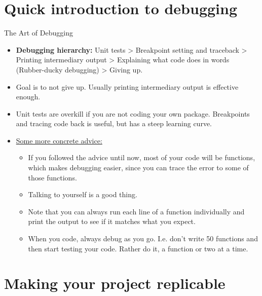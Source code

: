 \documentclass[aspectratio=169,xcolor=dvipsnames]{beamer}\usepackage[]{graphicx}\usepackage[]{color}
\begin{document}
\section{Quick introduction to debugging}

\begin{frame}[t]{The Art of Debugging}
  \begin{itemize}
    \item \textbf{Debugging hierarchy:} Unit tests \pause > Breakpoint setting and traceback \pause > Printing intermediary output \pause > Explaining what code does in words (Rubber-ducky debugging) \pause > Giving up.\pause
    \item Goal is to not give up. \alert{Usually printing intermediary output is effective enough.}\pause
    \item Unit tests are overkill if you are not coding your own package. Breakpoints and tracing code back is useful, but has a steep learning curve.\pause
    \item \underline{Some more concrete advice:}\pause
    \begin{itemize}
      \item If you followed the advice until now, most of your code will be functions, which makes debugging easier, since you can trace the error to some of those functions.\pause
      \item \alert{Talking to yourself is a good thing.}\pause
      \item Note that you can always run each line of a function individually and print the output to see if it matches what you expect.\pause
      \item \alert{When you code, always debug as you go.} I.e. don't write 50 functions and then start testing your code. Rather do it, a function or two at a time.
    \end{itemize}
  \end{itemize}
\end{frame}


\section{Making your project replicable}
\end{document}
